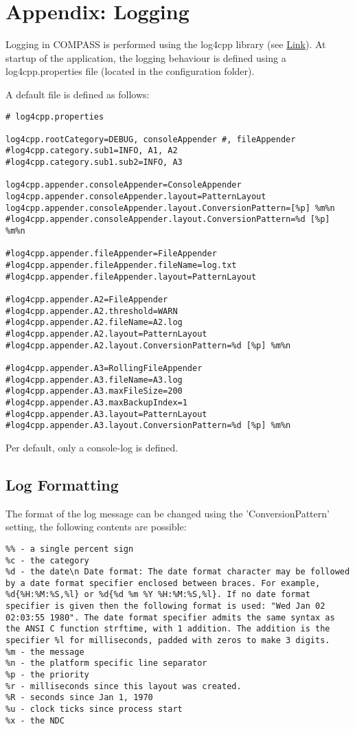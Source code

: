 \section{Appendix: Logging}
\label{sec:appendix_logging}
 
Logging in COMPASS is performed using the log4cpp library (see \href{https://log4cpp.sourceforge.net/}{Link}). At startup of the application, the logging behaviour is defined using a log4cpp.properties file (located in the configuration folder).

A default file is defined as follows:
\begin{lstlisting}
# log4cpp.properties

log4cpp.rootCategory=DEBUG, consoleAppender #, fileAppender
#log4cpp.category.sub1=INFO, A1, A2
#log4cpp.category.sub1.sub2=INFO, A3

log4cpp.appender.consoleAppender=ConsoleAppender
log4cpp.appender.consoleAppender.layout=PatternLayout
log4cpp.appender.consoleAppender.layout.ConversionPattern=[%p] %m%n 
#log4cpp.appender.consoleAppender.layout.ConversionPattern=%d [%p] %m%n 

#log4cpp.appender.fileAppender=FileAppender
#log4cpp.appender.fileAppender.fileName=log.txt
#log4cpp.appender.fileAppender.layout=PatternLayout

#log4cpp.appender.A2=FileAppender
#log4cpp.appender.A2.threshold=WARN
#log4cpp.appender.A2.fileName=A2.log
#log4cpp.appender.A2.layout=PatternLayout
#log4cpp.appender.A2.layout.ConversionPattern=%d [%p] %m%n 

#log4cpp.appender.A3=RollingFileAppender
#log4cpp.appender.A3.fileName=A3.log
#log4cpp.appender.A3.maxFileSize=200
#log4cpp.appender.A3.maxBackupIndex=1
#log4cpp.appender.A3.layout=PatternLayout
#log4cpp.appender.A3.layout.ConversionPattern=%d [%p] %m%n 
\end{lstlisting}

Per default, only a console-log is defined.

\subsection{Log Formatting}
The format of the log message can be changed using the 'ConversionPattern' setting, the following contents are possible:
\begin{lstlisting}
%% - a single percent sign
%c - the category
%d - the date\n Date format: The date format character may be followed by a date format specifier enclosed between braces. For example, %d{%H:%M:%S,%l} or %d{%d %m %Y %H:%M:%S,%l}. If no date format specifier is given then the following format is used: "Wed Jan 02 02:03:55 1980". The date format specifier admits the same syntax as the ANSI C function strftime, with 1 addition. The addition is the specifier %l for milliseconds, padded with zeros to make 3 digits.
%m - the message
%n - the platform specific line separator
%p - the priority
%r - milliseconds since this layout was created.
%R - seconds since Jan 1, 1970
%u - clock ticks since process start
%x - the NDC
\end{lstlisting}

